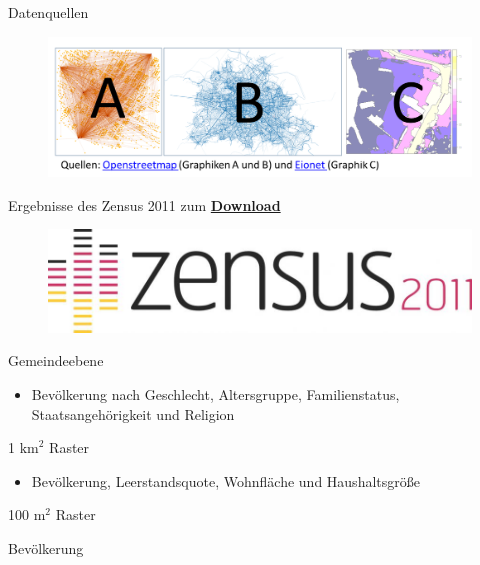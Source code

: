 \documentclass[ignorenonframetext,]{beamer}
\providecommand{\tightlist}{%
  \setlength{\itemsep}{0pt}\setlength{\parskip}{0pt}}
\begin{document}
\begin{frame}{Datenquellen}

\begin{figure}
\centering
\includegraphics{figure/Datenquellen.png}
\caption{}
\end{figure}

\end{frame}

\begin{frame}{Ergebnisse des Zensus 2011 zum
\href{https://www.zensus2011.de/SharedDocs/Aktuelles/Ergebnisse/DemografischeGrunddaten.html?nn=3065474}{\textbf{Download}}}

\begin{figure}
\centering
\includegraphics{figure/zensus2011_logo.jpg}
\caption{}
\end{figure}

\begin{block}{Gemeindeebene}

\begin{itemize}
\tightlist
\item
  Bevölkerung nach Geschlecht, Altersgruppe, Familienstatus,
  Staatsangehörigkeit und Religion
\end{itemize}

\end{block}

\begin{block}{1 \(\text{km}^2\) Raster}

\begin{itemize}
\tightlist
\item
  Bevölkerung, Leerstandsquote, Wohnfläche und Haushaltsgröße
\end{itemize}

\end{block}

\begin{block}{100 \(\text{m}^2\) Raster}

Bevölkerung

\end{block}

\end{frame}
\end{document}
